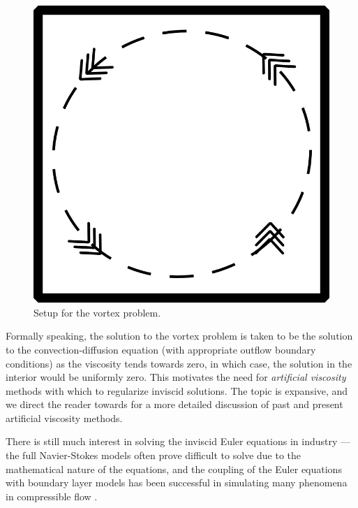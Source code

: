 \begin{figure}[!h]
\centering
\includegraphics[scale = .22]{figs/convCirc.png}
\caption{Setup for the vortex problem.}
\label{fig:convCirc}
\end{figure}
Formally speaking, the solution to the vortex problem is taken to be the solution to the convection-diffusion equation (with appropriate outflow boundary conditions) as the viscosity tends towards zero, in which case, the solution in the interior would be uniformly zero.  This motivates the need for \emph{artificial viscosity} methods with which to regularize inviscid solutions.  The topic is expansive, and we direct the reader towards \cite{Barter} for a more detailed discussion of past and present artificial viscosity methods. 

There is still much interest in solving the inviscid Euler equations in industry --- the full Navier-Stokes models often prove difficult to solve due to the mathematical nature of the equations, and the coupling of the Euler equations with boundary layer models has been successful in simulating many phenomena in compressible flow \cite{BoeingDrela}.  

